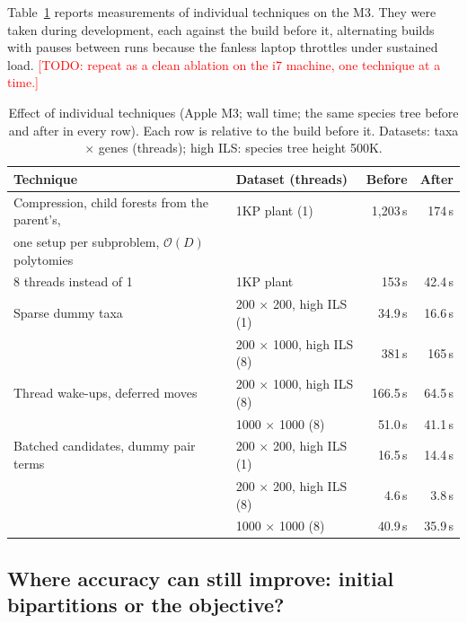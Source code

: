 \documentclass[11pt,a4paper]{article}
\newcommand{\todo}[1]{\textcolor{red}{[TODO: #1]}}
\newcommand{\Oh}{\mathcal{O}}
\begin{document}
Table~\ref{tab:techniques} reports measurements of individual techniques on the M3. They were taken
during development, each against the build before it, alternating builds with pauses between runs
because the fanless laptop throttles under sustained load. \todo{repeat as a clean ablation on the i7
machine, one technique at a time.}

\begin{table}[t]
\centering\small
\caption{Effect of individual techniques (Apple M3; wall time; the same species tree before and after
in every row). Each row is relative to the build before it. Datasets: taxa $\times$ genes (threads);
high ILS: species tree height 500K.}
\label{tab:techniques}
\begin{tabular}{llrr}
\toprule
Technique & Dataset (threads) & Before & After \\
\midrule
Compression, child forests from the parent's, & 1KP plant (1) & 1{,}203\,s & 174\,s \\
\quad one setup per subproblem, $\Oh(D)$ polytomies & & & \\
8 threads instead of 1 & 1KP plant & 153\,s & 42.4\,s \\
Sparse dummy taxa & 200 $\times$ 200, high ILS (1) & 34.9\,s & 16.6\,s \\
 & 200 $\times$ 1000, high ILS (8) & 381\,s & 165\,s \\
Thread wake-ups, deferred moves & 200 $\times$ 1000, high ILS (8) & 166.5\,s & 64.5\,s \\
 & 1000 $\times$ 1000 (8) & 51.0\,s & 41.1\,s \\
Batched candidates, dummy pair terms & 200 $\times$ 200, high ILS (1) & 16.5\,s & 14.4\,s \\
 & 200 $\times$ 200, high ILS (8) & 4.6\,s & 3.8\,s \\
 & 1000 $\times$ 1000 (8) & 40.9\,s & 35.9\,s \\
\bottomrule
\end{tabular}
\end{table}

\subsection{Where accuracy can still improve: initial bipartitions or the objective?}\label{sec:oracle}
\end{document}
